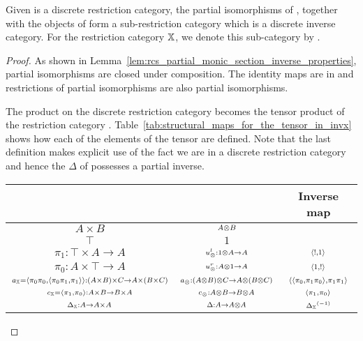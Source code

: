 \begin{proposition}\label{lem:inv_x_is_a_discrete_inverse_category}
  Given \X is a discrete restriction category, the partial isomorphisms of \X, together with the objects
  of \X form a sub-restriction category which is a discrete inverse category. For the restriction
  category $\mathbb{X}$, we denote this sub-category by \Invc{\X}.
\end{proposition}
\begin{proof}
  As shown in Lemma~\ref{lem:rcs_partial_monic_section_inverse_properties}, partial isomorphisms
  are closed under composition. The identity maps are in \Invc{\X} and restrictions of
  partial isomorphisms are also partial isomorphisms.

  The product on the discrete restriction category \X becomes the tensor product of the restriction
  category \Invc{\X}. Table~\ref{tab:structural_maps_for_the_tensor_in_invx} shows how each of the
  elements of the tensor are defined. Note that the last definition makes explicit use of the fact
  we are in a discrete restriction category and hence the $\Delta$ of \X possesses a partial
  inverse.

  \begin{table}[!htbp]
    \begin{center}
      \begin{tabular}{|ccc|}
        \hline
        \X & \Invc{\X} & Inverse map\\
        \hline\hline
        $\scriptstyle A\times B$ & $\scriptstyle A\otimes B$ &\\
        \hline
        $\scriptstyle \top$ & $\scriptstyle 1$ &\\
        \hline
        $\scriptstyle \pi_1:\top\times A \to A$ & $\scriptstyle u_{\otimes}^l:1\otimes A \to A$ & $\scriptstyle \langle!,1\rangle$\\
        \hline
        $\scriptstyle \pi_0:A\times\top \to A$ & $\scriptstyle u_{\otimes}^r:A\otimes1 \to A$& $\scriptstyle \langle1,!\rangle$\\
        \hline
        ${\scriptstyle a_{\mathbb{X}} = \langle\pi_0 \pi_0,\langle\pi_0 \pi_1,\pi_1\rangle\rangle:(A\times B)\times C \to A\times(B\times C)}$
          & $\scriptstyle a_{\otimes}:(A\otimes B)\otimes C \to A\otimes(B\otimes C)$
          & $\scriptstyle \langle\langle\pi_0, \pi_1 \pi_0\rangle,\pi_1 \pi_1\rangle$\\
        \hline
        $\scriptstyle c_{\mathbb{X}}=\langle \pi_1,\pi_0\rangle:A\times B \to B\times A$ & $\scriptstyle c_{\otimes}:A\otimes B \to B \otimes A$ & $\scriptstyle \langle \pi_1,\pi_0\rangle$\\
        \hline
        $\scriptstyle \Delta_{\mathbb{X}}:A\to A\times A$ & $\scriptstyle \Delta:A \to A\otimes A$ & $\scriptstyle  {\Delta_{\ensuremath{\mathbb{X}}}}^{(-1)} $\\
        \hline
      \end{tabular}


\end{center}
\end{table}
\end{proof}
